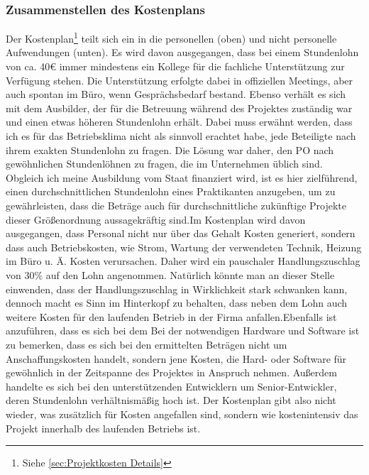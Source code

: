 \documentclass[11pt,toc=sectionentrywithoutdots, 
headheight=44pt, headings=optiontoheadandtoc, hyperfootnotes=false, hypertexnames=false]{scrartcl}
\newcommand\extendedref[1]{Siehe \ref{#1}}
\begin{document}
\subsubsection{Zusammenstellen des Kostenplans}
Der Kostenplan{\footnote{\extendedref{sec:Projektkosten Details}}} teilt sich ein in die personellen (oben) und nicht personelle Aufwendungen (unten). Es wird davon ausgegangen, dass bei einem Stundenlohn von ca. 40€ immer mindestens ein Kollege für die fachliche Unterstützung zur Verfügung stehen. Die Unterstützung erfolgte dabei in offiziellen Meetings, aber auch spontan im Büro, wenn Gesprächsbedarf bestand. Ebenso verhält es sich mit dem Ausbilder, der für die Betreuung während des Projektes zuständig war und einen etwas höheren Stundenlohn erhält. Dabei muss erwähnt werden, dass ich es für das Betriebsklima nicht als sinnvoll erachtet habe, jede Beteiligte nach ihrem exakten Stundenlohn zu fragen. Die Lösung war daher, den \acs{PO} nach gewöhnlichen Stundenlöhnen zu fragen, die im Unternehmen üblich sind. Obgleich ich meine Ausbildung vom Staat finanziert wird, ist es hier zielführend, einen durchschnittlichen Stundenlohn eines Praktikanten anzugeben, um zu gewährleisten, dass die Beträge auch für durchschnittliche zukünftige Projekte dieser Größenordnung aussagekräftig sind.\newline\newline Im Kostenplan wird davon ausgegangen, dass Personal nicht nur über das Gehalt Kosten generiert, sondern dass auch Betriebskosten, wie Strom, Wartung der verwendeten Technik, Heizung im Büro u. Ä. Kosten verursachen. Daher wird ein pauschaler Handlungszuschlag von 30\% auf den Lohn angenommen. Natürlich könnte man an dieser Stelle einwenden, dass der Handlungszuschlag in Wirklichkeit stark schwanken kann, dennoch macht es Sinn im Hinterkopf zu behalten, dass neben dem Lohn auch weitere Kosten für den laufenden Betrieb in der Firma anfallen.\newline\newline Ebenfalls ist anzuführen, dass es sich bei dem  Bei der notwendigen Hardware und Software ist zu bemerken, dass es sich bei den ermittelten Beträgen nicht um Anschaffungskosten handelt, sondern jene Kosten, die Hard- oder Software für gewöhnlich in der Zeitspanne des Projektes in Anspruch nehmen. Außerdem handelte es sich bei den unterstützenden Entwicklern um Senior-Entwickler, deren Stundenlohn verhältnismäßig hoch ist. Der Kostenplan gibt also nicht wieder, was zusätzlich für Kosten angefallen sind, sondern wie kostenintensiv das Projekt innerhalb des laufenden Betriebs ist.
\end{document}

